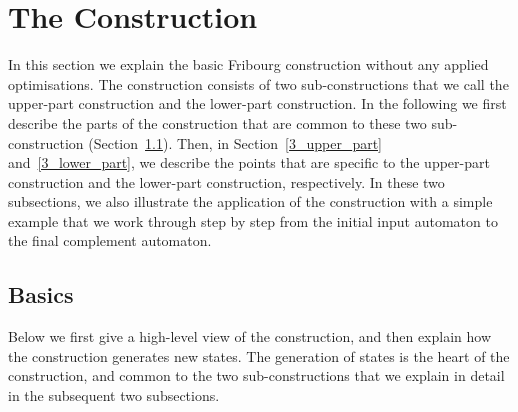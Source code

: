 

\section{The Construction}
\label{3_contruction}
In this section we explain the basic Fribourg construction without any applied optimisations. The construction consists of two sub-constructions that we call the upper-part construction and the lower-part construction. In the following  we first describe the parts of the construction that are common to these two sub-construction (Section~\ref{3_basics}). Then, in Section~\ref{3_upper_part} and~\ref{3_lower_part}, we describe the points that are specific to the upper-part construction and the lower-part construction, respectively. In these two subsections, we also illustrate the application of the construction with a simple example that we work through step by step from the initial input automaton to the final complement automaton.

\subsection{Basics}
\label{3_basics}
Below we first give a high-level view of the construction, and then explain how the construction generates new states. The generation of states is the heart of the construction, and common to the two sub-constructions that we explain in detail in the subsequent two subsections.

